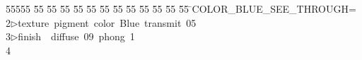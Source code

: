 %
%
\begin{tabbing}
55555 \= 55 \= 55 \= 55 \= 55 \= 55 \= 55 \= 55 \= 55 \= 55 \= 55 \= 55 \= 55 \= \>COLOR\_BLUE\_SEE\_THROUGH=\\[0pt]
2\>$\triangleright$\>texture\ pigment\ color\ Blue\ transmit\ 05\ \ \\[0pt]
3\>$\triangleright$\>finish\ \ diffuse\ 09\ phong\ 1\\[0pt]
4\>\end{tabbing}
